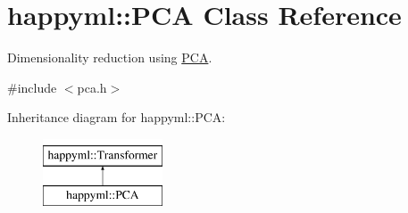 \hypertarget{classhappyml_1_1PCA}{}\section{happyml\+:\+:P\+CA Class Reference}
\label{classhappyml_1_1PCA}


Dimensionality reduction using \hyperlink{classhappyml_1_1PCA}{P\+CA}.  




{\ttfamily \#include $<$pca.\+h$>$}

Inheritance diagram for happyml\+:\+:P\+CA\+:\begin{figure}[H]
\begin{center}
\leavevmode
\includegraphics[height=2.000000cm]{classhappyml_1_1PCA}
\end{center}
\end{figure}
